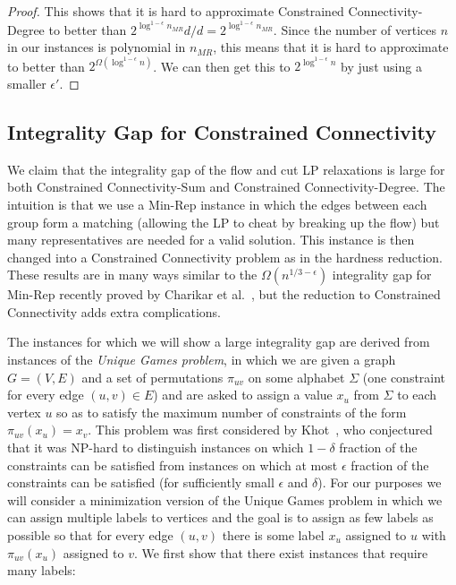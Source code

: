 \documentclass[11pt,letterpaper]{article}
\theoremstyle{definition}
\begin{document}
\begin{proof}
This shows that it is hard to approximate {\sc Constrained Connectivity-Degree} to better than $2^{\log^{1-\epsilon} n_{MR}} d / d = 2^{\log^{1-\epsilon} n_{MR}}$.  Since the number of vertices $n$ in our instances is polynomial in $n_{MR}$, this means that it is hard to approximate to better than $2^{\Omega(\log^{1-\epsilon} n)}$.  We can then get this to $2^{\log^{1-\epsilon} n}$ by just using a smaller $\epsilon'$.
\end{proof}



\subsection{Integrality Gap for Constrained Connectivity}


We claim that the integrality gap of the flow and cut LP relaxations is large for both {\sc
  Constrained Connectivity-Sum} and {\sc Constrained Connectivity-Degree}.  The intuition is that we use a {\sc Min-Rep} instance in which the edges between each group form a matching (allowing the LP to cheat by breaking up the flow) but many representatives are needed for a valid solution.  This instance is then changed into a Constrained Connectivity problem as in the hardness reduction.  These results are in many ways similar to the $\Omega(n^{1/3 - \epsilon})$ integrality gap for {\sc Min-Rep} recently proved by Charikar et al.~\cite{CHK09}, but the reduction to Constrained Connectivity adds extra complications.

  The instances for
which we will show a large integrality gap are derived from instances
of the \emph{Unique Games problem}, in which we are given a graph
$G=(V,E)$ and a set of permutations $\pi_{uv}$ on some alphabet
$\Sigma$ (one constraint for every edge $(u,v) \in E$) and are asked
to assign a value $x_u$ from $\Sigma$ to each vertex $u$ so as to satisfy
the maximum number of constraints of the form $\pi_{uv}(x_u) = x_v$.
This problem was first considered by Khot~\cite{khot:02}, who
conjectured that it was NP-hard to distinguish instances on which
$1-\delta$ fraction of the constraints can be satisfied from instances
on which at most $\epsilon$ fraction of the constraints can be
satisfied (for sufficiently small $\epsilon$ and $\delta$).  For our
purposes we will consider a minimization version of the Unique Games
problem in which we can assign multiple labels to vertices and the
goal is to assign as few labels as possible so that for every edge
$(u,v)$ there is some label $x_u$ assigned to $u$ with $\pi_{uv}(x_u)$
assigned to $v$.  We first show that there exist instances that
require many labels:
\end{document}
